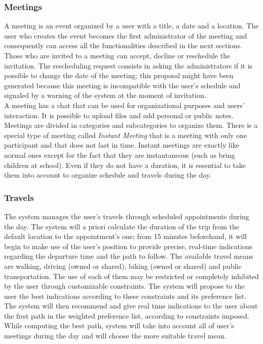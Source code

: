 
\subsubsection{Meetings}
A meeting is an event organized by a user with a title, a date and a location. The user who creates the event becomes the first administrator of the meeting and consequently can access all the functionalities described in the next sections. Those who are invited to a meeting can accept, decline or reschedule the invitation. The rescheduling request consists in asking the administrators if it is possible to change the date of the meeting; this proposal might have been generated because this meeting is incompatible with the user's schedule and signaled by a warning of the system at the moment of invitation. \\
A meeting has a chat that can be used for organizational purposes and users' interaction. It is possible to upload files and add personal or public notes.\\
Meetings are divided in categories and subcategories to organize them. There is a special type of meeting called \textit{Instant Meeting} that is a meeting with only one participant and that does not last in time. Instant meetings are exactly like normal ones except for the fact that they are instantaneous (such as bring children at school). Even if they do not have a duration, it is essential to take them into account to organize schedule and travels during the day.
	
\subsubsection{Travels}

The system manages the user's travels through scheduled appointments during the day. The system will a priori calculate the duration of the trip from the default location to the appointment's one; from 15 minutes beforehand, it will begin to make use of the user's position to provide precise, real-time indications regarding the departure time and the path to follow. The available travel means are walking, driving (owned or shared), biking (owned or shared) and public transportation. The use of each of them may be restricted or completely inhibited by the user through customizable constraints. The system will propose to the user the best indications according to these constraints and its preference list. The system will then recommend and give real time indications to the user about the first path in the weighted preference list, according to constraints imposed. While computing the best path, system will take into account all of user's meetings during the day and will choose the more suitable travel mean.
